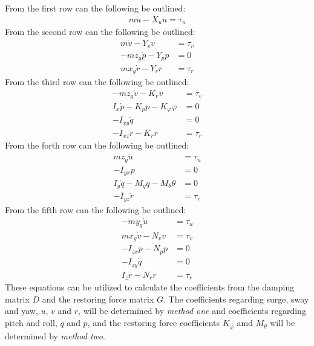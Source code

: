From the first row can the following be outlined:
\begin{align}
m\dot u - X_uu = \tau_{u}
\end{align}
From the second row can the following be outlined:
\begin{align}
m\dot v - Y_vv &= \tau_{v}\\
-mz_g\dot p - Y_pp &= 0\\
mx_g\dot r - Y_rr &= \tau_{r}
\end{align}
From the third row can the following be outlined:
\begin{align}
-mz_g\dot v - K_vv &= \tau_{v}\\
I_x\dot p - K_pp - K_\varphi\varphi &= 0\\
-I_{xy}\dot q &= 0\\
-I_{xz}\dot r - K_rr &= \tau_{r}
\end{align}
From the forth row can the following be outlined:
\begin{align}
mz_g\dot u &= \tau_{u}\\
-I_{yx}\dot p &= 0\\
I_y\dot q - M_qq - M_\theta \theta&= 0\\
-I_{yz}\dot r &= \tau_{r}
\end{align}
From the fifth row can the following be outlined:
\begin{align}
-my_g\dot u &= \tau_{u}\\
mx_g\dot v - N_vv &= \tau_{v}\\
-I_{zx}\dot p - N_pp &= 0\\
-I_{zy}\dot q &= 0\\
I_z\dot r - N_rr &= \tau_{r}
\end{align}
These equations can be utilized to calculate the coefficients from the damping matrix $D$ and the restoring force matrix $G$. The coefficients regarding surge, sway and yaw, $u$, $v$ and $r$, will be determined by \textit{method one} and coefficients regarding pitch and roll, $q$ and $p$, and the restoring force coefficients $K_\varphi$ amd $M_\theta$ will be determined by \textit{method two}.

